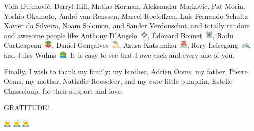 Vida Dujmovi\'c,
Darryl Hill,
Matias Korman,
Aleksandar Markovic,
Pat Morin,
Yoshio Okamoto,
André van Renssen,
Marcel Roeloffzen,
Luís Fernando Schultz Xavier da Silveira,
Noam Solomon,
and
Sander Verdonschot,
%
and
%
totally random and awesome people like
Anthony D'Angelo~\includegraphics[height=1em]{figures/1f39e},
Édouard Bonnet~\includegraphics[height=1em]{figures/1f428},
Radu Curticapean~\includegraphics[height=1em]{figures/1f1ea-1f1f9},
Daniel Gonçalves~\includegraphics[height=1em]{figures/26f1},
Azusa Katsumizu~\includegraphics[height=1em]{figures/1f3ef},
Rory Leisegang~\includegraphics[height=1em]{figures/1f6b2},
and
Jules Wulms~\includegraphics[height=1em]{figures/26f0}.
It is easy to see that I owe each and every one of you.

Finally, I wish to thank my family:
my brother, Adrien Ooms,
my father, Pierre Ooms,
my mother, Nathalie Rooseleer,
%
and
%
my cute little pumpkin, Estelle Chasseloup,
for their support and love.

\vspace{\fill}
\centerline{\LARGE GRATITUDE!}
\vspace{\fill}
\centerline{\LARGE
\includegraphics[height=1em]{figures/1f647}
\includegraphics[height=1em]{figures/1f647}
\includegraphics[height=1em]{figures/1f647}
}
\vspace{\fill}
